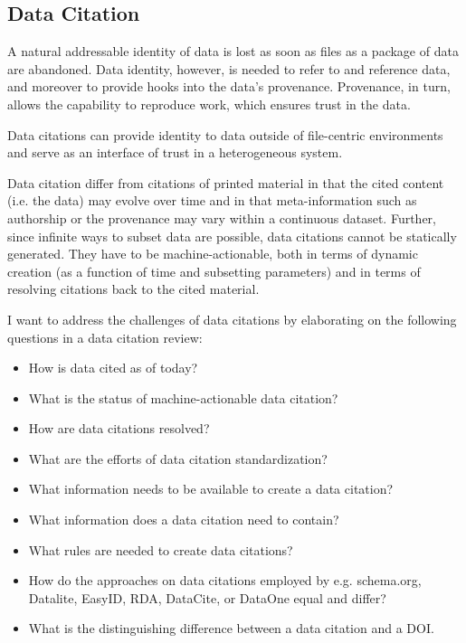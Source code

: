 \documentclass[a4paper,10pt]{article}
\begin{document}
\newpage
\subsection{Data Citation}
A natural addressable identity of data is lost as soon as files as a package of data are abandoned.
Data identity, however, is needed to refer to and reference data, and moreover to provide hooks into the data's provenance. Provenance, in turn, allows the capability to reproduce work, which ensures trust in the data. 

Data citations can provide identity to data outside of file-centric environments and serve as an interface of trust in a heterogeneous system. 


Data citation differ from citations of printed material in that the cited content (i.e. the data) may evolve over time and in that meta-information such as authorship or the provenance may vary within a continuous dataset. Further, since infinite ways to subset data are possible, data citations cannot be statically generated. They have to be machine-actionable, both in terms of dynamic creation (as a function of time and subsetting parameters) and in terms of resolving citations back to the cited material.

I want to address the challenges of data citations by elaborating on the following questions in a data citation review:

\begin{itemize}
    \item   How is data cited as of today? 
    \item   What is the status of machine-actionable data citation? 
    \item   How are data citations resolved?
    \item   What are the efforts of data citation standardization? 
    \item   What information needs to be available to create a data citation?
    \item   What information does a data citation need to contain?
    \item   What rules are needed to create data citations?    
    \item   How do the approaches on data citations employed by e.g. schema.org, Datalite,  EasyID, RDA, DataCite, or DataOne equal and differ?    
    \item   What is the distinguishing difference between a data citation and a \gls{DOI}.
\end{itemize}
\end{document}
